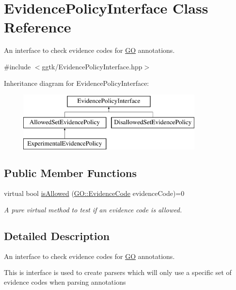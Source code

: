 \hypertarget{classEvidencePolicyInterface}{}\section{Evidence\+Policy\+Interface Class Reference}
\label{classEvidencePolicyInterface}


An interface to check evidence codes for \hyperlink{namespaceGO}{GO} annotations.  




{\ttfamily \#include $<$ggtk/\+Evidence\+Policy\+Interface.\+hpp$>$}

Inheritance diagram for Evidence\+Policy\+Interface\+:\begin{figure}[H]
\begin{center}
\leavevmode
\includegraphics[height=3.000000cm]{classEvidencePolicyInterface}
\end{center}
\end{figure}
\subsection*{Public Member Functions}
\begin{DoxyCompactItemize}
\item 
virtual bool \hyperlink{classEvidencePolicyInterface_a432d20dd05ec54db46a452ae8d6be4a7}{is\+Allowed} (\hyperlink{namespaceGO_a4ce5387bbcdaec3648957c7903f2caf3}{G\+O\+::\+Evidence\+Code} evidence\+Code)=0
\begin{DoxyCompactList}\small\item\em A pure virtual method to test if an evidence code is allowed. \end{DoxyCompactList}\end{DoxyCompactItemize}


\subsection{Detailed Description}
An interface to check evidence codes for \hyperlink{namespaceGO}{GO} annotations. 

This is interface is used to create parsers which will only use a specific set of evidence codes when parsing annotations 

